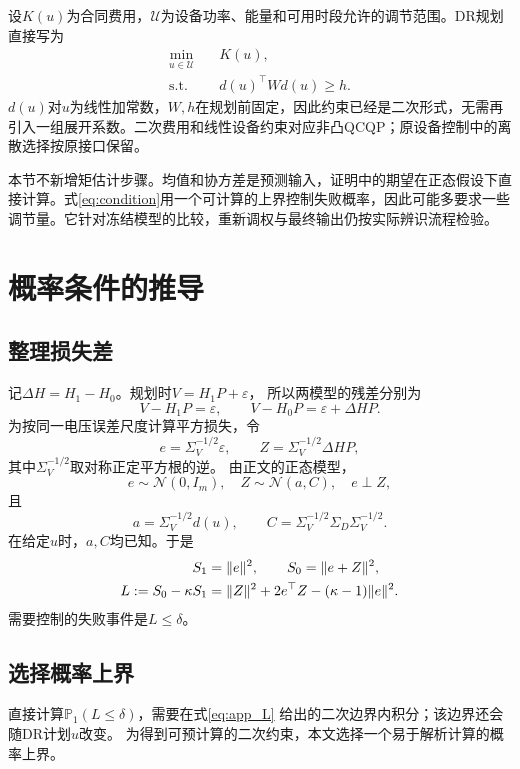 \documentclass[journal,10pt]{IEEEtran}
\newcommand{\Prob}{\mathbb P}
\begin{document}
设$K(u)$为合同费用，$\mathcal U$为设备功率、能量和可用时段允许的调节范围。DR规划直接写为
\begin{equation}
\boxed{
\begin{aligned}
\min_{u\in\mathcal U}\quad &K(u),\\
\mathrm{s.t.}\quad &d(u)^\top Wd(u)\ge h.
\end{aligned}} \label{eq:optimization}
\end{equation}
$d(u)$对$u$为线性加常数，$W,h$在规划前固定，因此约束已经是二次形式，无需再引入一组展开系数。二次费用和线性设备约束对应非凸QCQP；原设备控制中的离散选择按原接口保留。

本节不新增矩估计步骤。均值和协方差是预测输入，证明中的期望在正态假设下直接计算。式\eqref{eq:condition}用一个可计算的上界控制失败概率，因此可能多要求一些调节量。它针对冻结模型的比较，重新调权与最终输出仍按实际辨识流程检验。

\clearpage
\appendices
\section{概率条件的推导}

\subsection{整理损失差}
记$\Delta H=H_1-H_0$。规划时$V=H_1P+\varepsilon$，
所以两模型的残差分别为
\[
V-H_1P=\varepsilon,\qquad
V-H_0P=\varepsilon+\Delta H P.
\]
为按同一电压误差尺度计算平方损失，令
\begin{equation}
e=\Sigma_V^{-1/2}\varepsilon,\qquad
Z=\Sigma_V^{-1/2}\Delta H P, \label{eq:app_ez}
\end{equation}
其中$\Sigma_V^{-1/2}$取对称正定平方根的逆。
由正文的正态模型，
\[
e\sim\mathcal N(0,I_m),\quad Z\sim\mathcal N(a,C),\quad e\perp Z,
\]
且
\[
a=\Sigma_V^{-1/2}d(u),\qquad
C=\Sigma_V^{-1/2}\Sigma_D\Sigma_V^{-1/2}.
\]
在给定$u$时，$a,C$均已知。于是
\begin{align}
S_1&=\|e\|^2,\qquad S_0=\|e+Z\|^2,\notag\\
L:=S_0-\kappa S_1
&=\|Z\|^2+2e^\top Z-(\kappa-1)\|e\|^2. \label{eq:app_L}
\end{align}
需要控制的失败事件是$L\le\delta$。

\subsection{选择概率上界}
直接计算$\Prob_1(L\le\delta)$，需要在式\eqref{eq:app_L}
给出的二次边界内积分；该边界还会随DR计划$u$改变。
为得到可预计算的二次约束，本文选择一个易于解析计算的概率上界。
\end{document}
